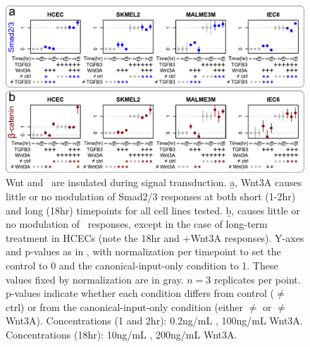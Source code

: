   \begin{figure}[!bt]
  \centering
  \includegraphics[width=6.5in]{FIGS/insulation/wntTgfbInsulation+.pdf}
  {\singlespacing 
  \caption[Wnt and \tgf\ are insulated during signal transduction (all data).]
        { Wnt and \tgf\ are insulated during signal transduction.
          \b{a}, Wnt3A causes little or no modulation of Smad2/3 responses at
          both short (1-2hr) and long (18hr) timepoints for all
          cell lines tested. \b{b},  causes little or no
          modulation of \bcat\ responses, except in the case of
          long-term treatment in HCECs (note the 18hr  and 
          +Wnt3A responses). Y-axes and p-values as in
          , with normalization per
          timepoint to set the control to 0 and the canonical-input-only
          condition to 1. These values fixed by normalization are in gray.
          $n=3$ replicates per point. p-values indicate
          whether each condition differs from control
          ($\neq$ctrl) or from the canonical-input-only
          condition (either $\neq$ or $\neq$Wnt3A).
          Concentrations (1 and 2hr): 0.2ng/mL ,
          100ng/mL Wnt3A. Concentrations (18hr): 10ng/mL ,
          200ng/mL Wnt3A.
          }
  \label{fig:insulation:wntTgfbInsulation}}
  \end{figure}
  

